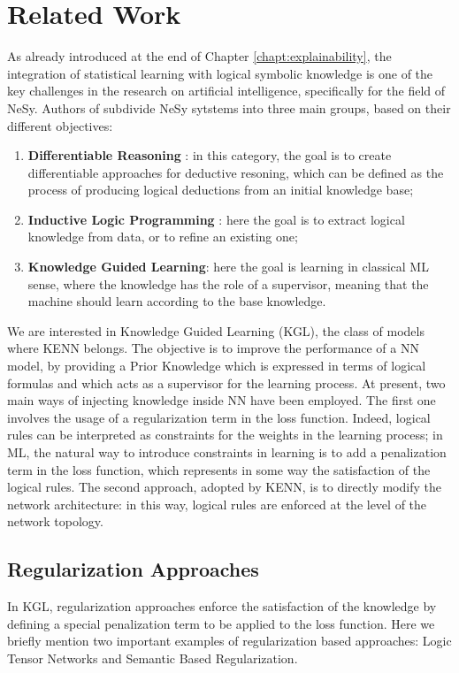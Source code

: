  
 \section{Related Work}
 As already introduced at the end of Chapter \ref{chapt:explainability}, the integration of statistical learning with logical symbolic knowledge is one of the key challenges in the research on artificial intelligence, specifically for the field of NeSy. Authors of \cite{daniele2019kenn} subdivide NeSy sytstems into three main groups, based on their different objectives:
 \begin{enumerate}
 	\item \textbf{Differentiable Reasoning }: in this category, the goal is to create differentiable approaches for deductive resoning, which can be defined as the process of producing logical deductions from an initial knowledge base;
 	\item \textbf{Inductive Logic Programming} : here the goal is to extract logical knowledge from data, or to refine an existing one;
 	\item \textbf{Knowledge Guided Learning}: here the goal is learning in classical ML sense, where the knowledge has the role of a supervisor, meaning that the machine should learn according to the base knowledge.
 \end{enumerate}

 We are interested in Knowledge Guided Learning (KGL), the class of models where KENN belongs. The objective is to improve the performance of a NN model, by providing a Prior Knowledge which is expressed in terms of logical formulas and which acts as a supervisor for the learning process. At present, two main ways of injecting knowledge inside NN have been employed. The first one involves the usage of a regularization term in the loss function. Indeed, logical rules can be interpreted as constraints for the weights in the learning process; in ML, the natural way to introduce constraints in learning is to add a penalization term in the loss function, which represents in some way the satisfaction of the logical rules. The second approach, adopted by KENN, is to directly modify the network architecture: in this way, logical rules are enforced at the level of the network topology.
 
 \subsection{Regularization Approaches}
In KGL, regularization approaches enforce the satisfaction of the knowledge by defining a special penalization term to be applied to the loss function. Here we briefly mention two important examples of regularization based approaches: Logic Tensor Networks and Semantic Based Regularization.
 
